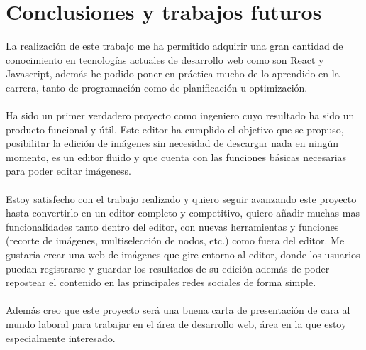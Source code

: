 \chapter{Conclusiones y trabajos futuros}




La realización de este trabajo me ha permitido adquirir una gran cantidad de conocimiento
en tecnologías actuales de desarrollo web como son React y Javascript, además he podido
poner en práctica mucho de lo aprendido en la carrera, tanto de programación como de 
planificación u optimización.
\\\\
Ha sido un primer verdadero proyecto como ingeniero cuyo resultado ha sido 
un producto funcional y útil.
Este editor ha cumplido el objetivo que se propuso, posibilitar la edición de imágenes
sin necesidad de descargar nada en ningún momento, es un editor fluido y que cuenta 
con las funciones básicas necesarias para poder editar imágeness.
\\\\
Estoy satisfecho con el trabajo realizado y quiero seguir avanzando este proyecto hasta 
convertirlo en un editor completo y competitivo, quiero añadir muchas mas funcionalidades
tanto dentro del editor, con nuevas herramientas y funciones (recorte de imágenes, 
multiselección de nodos, etc.) como fuera del editor. 
Me gustaría crear una web de imágenes
que gire entorno al editor, donde los usuarios puedan registrarse y guardar los resultados
de su edición además de poder repostear el contenido en las principales redes sociales
de forma simple.
\\\\
Además creo que este proyecto será una buena carta de presentación de cara al mundo
laboral para trabajar en el área de desarrollo web, área en la que estoy especialmente
interesado.
